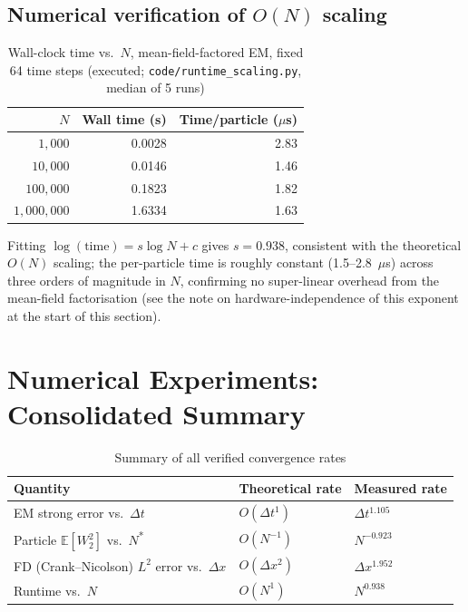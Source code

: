 \documentclass[11pt]{article}
\theoremstyle{remark}
\begin{document}
\subsection{Numerical verification of $O(N)$ scaling}

\begin{table}[ht]
\centering
\caption{Wall-clock time vs.\ $N$, mean-field-factored EM, fixed 64 time steps
(executed; \texttt{code/runtime\_scaling.py}, median of 5 runs)}
\label{tab:runtime-results}
\begin{tabular}{rrr}
\toprule
$N$ & Wall time (s) & Time/particle ($\mu$s) \\
\midrule
$1{,}000$     & 0.0028 & 2.83 \\
$10{,}000$    & 0.0146 & 1.46 \\
$100{,}000$   & 0.1823 & 1.82 \\
$1{,}000{,}000$ & 1.6334 & 1.63 \\
\bottomrule
\end{tabular}
\end{table}

Fitting $\log(\text{time}) = s\log N + c$ gives $s=0.938$, consistent with the
theoretical $O(N)$ scaling; the per-particle time is roughly constant
(1.5--2.8~$\mu$s) across three orders of magnitude in $N$, confirming no
super-linear overhead from the mean-field factorisation (see the note on
hardware-independence of this exponent at the start of this section).

\section{Numerical Experiments: Consolidated Summary}
\label{sec:experiments}

\begin{table}[ht]
\centering
\caption{Summary of all verified convergence rates}
\label{tab:summary}
\begin{tabular}{lll}
\toprule
\textbf{Quantity} & \textbf{Theoretical rate} & \textbf{Measured rate} \\
\midrule
EM strong error vs.\ $\Delta t$ & $O(\Delta t^{1})$ & $\Delta t^{1.105}$ \\
Particle $\mathbb{E}[W_2^2]$ vs.\ $N$\textsuperscript{*} & $O(N^{-1})$ & $N^{-0.923}$ \\
FD (Crank--Nicolson) $L^2$ error vs.\ $\Delta x$ & $O(\Delta x^{2})$ & $\Delta x^{1.952}$ \\
Runtime vs.\ $N$ & $O(N^{1})$ & $N^{0.938}$ \\
\bottomrule
\end{tabular}
\end{table}
\end{document}
